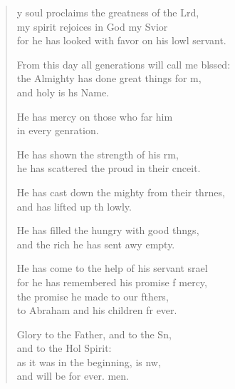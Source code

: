 \settowidth{\versewidth}{From this day all generations will call me blessed: +}
\begin{verse}%
  \begin{patverse}
y soul proclaims the greatness of the Lrd,\Flex\\
my spirit rejoices in God my Svior\Med\\
for he has looked with favor on his lowl servant.

From this day all generations will call me blssed:\Flex\\
the Almighty has done great things for m,\Med\\
and holy is h\pointup{\i}s Name.

He has mercy on those who far him\Med\\
in every genration.

He has shown the strength of his rm,\Med\\
he has scattered the proud in their cnceit.

He has cast down the mighty from their thrnes,\Med\\
and has lifted up th lowly.

He has filled the hungry with good thngs,\Med\\
and the rich he has sent awy empty.

He has come to the help of his servant srael\Med\\
for he has remembered his promise f mercy,\\
the promise he made to our fthers,\Med\\
to Abraham and his children fr ever.

Glory to the Father, and to the Sn,\Med\\
and to the Hol Spirit:\\
as it was in the beginning, is nw,\Med\\
and will be for ever. men.
  \end{patverse}
\end{verse}
